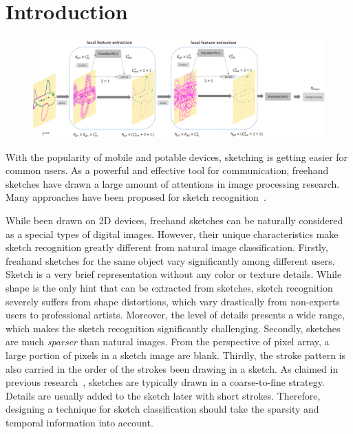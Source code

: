 \section{Introduction}
\label{sec:intro}

\begin{figure}
    \center
    \includegraphics[width=7in]{images/sketchpointnet.png}
    \label{fig:sketchpointnet}
\end{figure}

With the popularity of mobile and potable devices, sketching is getting easier for common users. As a powerful and effective tool for communication, freehand sketches have drawn a large amount of attentions in image processing research.
Many approaches have been proposed for sketch recognition~\cite{Eitz2012HowDH, LiHSG15, Schneider2014SketchCA, Yu2015SketchaNetTB, Seddati2015DeepSketchDC, Dupont2016DeepSketch2D}.


While been drawn on 2D devices, freehand sketches can be naturally considered as a special types  of digital images.
However, their unique characteristics make sketch recognition greatly different from natural image classification.
%
Firstly, freahand sketches for the same object vary significantly among different users.
Sketch is a very brief representation without any color or texture details.
%
While shape is the only hint that can be extracted from sketches, sketch recognition severely suffers from shape distortions, which vary drastically from non-experts users to professional artists.
Moreover, the level of details presents a wide range, which makes the sketch recognition significantly challenging.
%
Secondly, sketches are much \emph{sparser} than natural images.
From the perspective of pixel array, a large portion of pixels in a sketch image are blank.
Thirdly, the stroke pattern is also carried in the order of the strokes been drawing in a sketch. As claimed in previous research~\cite{Eitz2012HowDH}, sketches are typically drawn in a coarse-to-fine strategy. Details are usually added to the sketch later with short strokes.
Therefore, designing a technique for sketch classification should take the sparsity and temporal information into account.



